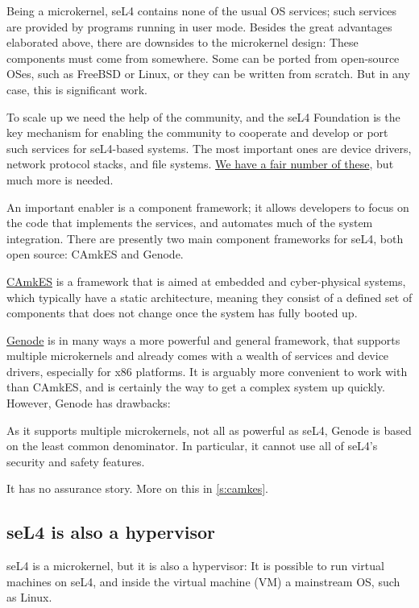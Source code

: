 \documentclass[english,a4paper,12pt\ifDraft,draft\fi]{report}
\newcommand{\SSect}[1]{\subsection{#1}}
\newcommand{\SSect}[1]{\section{#1}}
\providecommand{\href}[2]{\url{#2}}
\begin{document}
  Being a microkernel, seL4 contains none of the usual OS
  services; such services are  provided by  programs running in user
  mode. Besides the great advantages elaborated above,
  there are downsides to the microkernel design:  These components
  must come from somewhere. Some can be ported from open-source OSes, such as
  FreeBSD or Linux, or they can be written from scratch. But in any
  case, this is significant work.

  To scale up we need the help of the community, and the seL4
  Foundation is the key mechanism for enabling the community to
  cooperate and develop or port such services for seL4-based
  systems. The most important ones are device drivers, network
  protocol stacks, and file
  systems. \href{https://docs.sel4.systems/projects/available-user-components.html}{We
    have a fair number of these}, but much  more is needed.

  An important enabler is a component framework; it allows developers
  to focus on the code that implements the services, and automates
  much of the system integration. There are presently two main
  component frameworks for seL4, both open source: CAmkES and Genode.

  \href{https://trustworthy.systems/projects/TS/camkes/}{CAmkES} is a
  framework that is aimed at embedded and cyber-physical systems,
  which typically have a static architecture, meaning they consist of
  a defined set of components that does not change once the system has
  fully booted up.

  \href{https://genode.org/}{Genode} is in many ways a more powerful
  and general framework, that supports multiple microkernels and
  already comes with a wealth of services and device drivers,
  especially for x86 platforms. It is arguably more convenient
  to work with than CAmkES, and is certainly the way to get a
  complex system up quickly. However, Genode has drawbacks:
  \begin{inparaenum}
  \item As it supports multiple microkernels, not all as powerful as
    seL4, Genode is based on the least common denominator. In
    particular, it cannot use all of seL4's security and safety
    features.
  \item It has no assurance story. More on this in \autoref{s:camkes}.
  \end{inparaenum}

  \SSect{seL4 is also a hypervisor}\label{s:hyp}

  seL4 is a microkernel, but it is also a hypervisor: It is possible
  to run virtual machines on seL4, and inside the virtual machine (VM)
  a mainstream OS, such as Linux.
\end{document}
